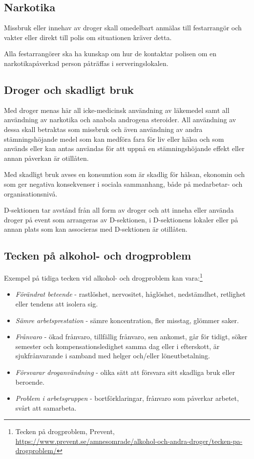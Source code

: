 \documentclass[]{dsekkallelse}
\begin{document}
\subsection{Narkotika}
Missbruk eller innehav av droger skall omedelbart anmälas till festarrangör och vakter eller
direkt till polis om situationen kräver detta.

Alla festarrangörer ska ha kunskap om hur de kontaktar polisen om en narkotikapåverkad person påträffas i serveringslokalen.

\subsection{Droger och skadligt bruk}
Med droger menas här all icke-medicinsk användning av läkemedel samt all användning av
narkotika och anabola androgena steroider. All användning av dessa skall betraktas som
missbruk och även användning av andra stämningshöjande medel som kan medföra fara för
liv eller hälsa och som används eller kan antas användas för att uppnå en stämningshöjande
effekt eller annan påverkan är otillåten.

Med skadligt bruk avses en konsumtion som är skadlig för hälsan, ekonomin och som ger negativa konsekvenser i sociala sammanhang, både på medarbetar- och organisationsnivå.

D-sektionen tar avstånd från all form av droger och att inneha eller använda droger på event
som arrangeras av D-sektionen, i D-sektionens lokaler eller på annan plats som kan associeras med D-sektionen är otillåten.

\subsection{Tecken på alkohol- och drogproblem}
Exempel på tidiga tecken vid alkohol- och drogproblem kan vara:\footnote{Tecken på drogproblem, Prevent, \url{https://www.prevent.se/amnesomrade/alkohol-och-andra-droger/tecken-pa-drogproblem/}
}
\begin{itemize}
    \item \emph{Förändrat beteende} - rastlöshet, nervositet, håglöshet, nedstämdhet, retlighet eller tendens att isolera sig.
    \item \emph{Sämre arbetsprestation} - sämre koncentration, fler misstag, glömmer saker.
    \item \emph{Frånvaro} - ökad frånvaro, tillfällig frånvaro, sen ankomst, går för tidigt, söker semester och kompensationsledighet samma dag eller i efterskott, är sjukfrånvarande i samband med helger och/eller löneutbetalning.
    \item \emph{Försvarar droganvändning} - olika sätt att försvara sitt skadliga bruk eller beroende.
    \item \emph{Problem i arbetsgruppen} - bortförklaringar, frånvaro som påverkar arbetet, svårt att samarbeta.
\end{itemize}
\end{document}
